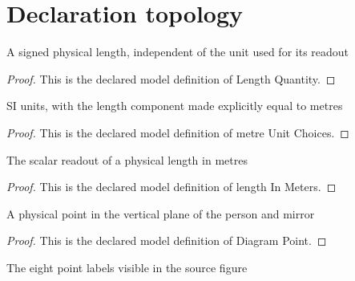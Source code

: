 \section{Declaration topology}
\begin{definition}
  \label{def:physics:phyx-mini-0141:phyxminiproblems-problemphyxmini0141-lengthquantity}
  A signed physical length, independent of the unit used for its readout
\end{definition}
\begin{proof}
  This is the declared model definition of Length Quantity.
\end{proof}
\begin{definition}
  \label{def:physics:phyx-mini-0141:phyxminiproblems-problemphyxmini0141-metreunitchoices}
  SI units, with the length component made explicitly equal to metres
\end{definition}
\begin{proof}
  This is the declared model definition of metre Unit Choices.
\end{proof}
\begin{definition}
  \label{def:physics:phyx-mini-0141:phyxminiproblems-problemphyxmini0141-lengthinmeters}
  The scalar readout of a physical length in metres
\end{definition}
\begin{proof}
  This is the declared model definition of length In Meters.
\end{proof}
\begin{definition}
  \label{def:physics:phyx-mini-0141:phyxminiproblems-problemphyxmini0141-diagrampoint}
  A physical point in the vertical plane of the person and mirror
\end{definition}
\begin{proof}
  This is the declared model definition of Diagram Point.
\end{proof}
\begin{definition}
  \label{def:physics:phyx-mini-0141:phyxminiproblems-problemphyxmini0141-figurepoint}
  The eight point labels visible in the source figure
\end{definition}
